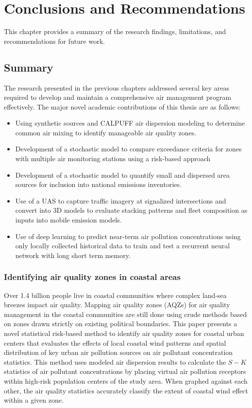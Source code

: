 \chapter{Conclusions and Recommendations}
This chapter provides a summary of the research findings, limitations, and recommendations for future work.

\section{Summary}

The research presented in the previous chapters addressed several key areas required to develop and maintain a comprehensive air management program effectively. The major novel academic contributions of this thesis are as follows:

\begin{itemize}
\item {Using synthetic sources and CALPUFF air dispersion modeling to determine common air mixing to identify manageable air quality zones.}
\item {Development of a stochastic model to compare exceedance criteria for zones with multiple air monitoring stations using a risk-based approach}
\item{Development of a stochastic model to quantify small and dispersed area sources for inclusion into national emissions inventories.}
\item{Use of a UAS to capture traffic imagery at signalized intersections and convert into 3D models to evaluate stacking patterns and fleet composition as inputs into mobile emission models}.
\item{Use of deep learning to predict near-term air pollution concentrations using only locally collected historical data to train and test a recurrent neural network with long short term memory.}
\end{itemize}

\subsection{Identifying air quality zones in coastal areas}

Over 1.4 billion people live in coastal communities where complex land-sea breezes impact air quality.  Mapping air quality zones (AQZs) for air quality management in the coastal communities are still done using crude methods based on zones drawn strictly on existing political boundaries. This paper presents a novel statistical risk-based method to identify air quality zones for coastal urban centers that evaluates the effects of local coastal wind patterns and spatial distribution of key urban air pollution sources on air pollutant concentration statistics.  This method uses modeled air dispersion results to calculate the $S-K$ statistics of air pollutant concentrations by placing virtual air pollution receptors within high-risk population centers of the study area.  When graphed against each other, the air quality statistics accurately classify the extent of coastal wind effect within a given zone.
 
